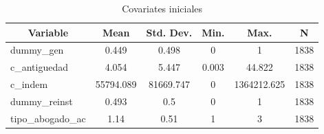 
\begin{table}[htbp]\centering \caption{Covariates iniciales \label{sumstat}}
\begin{tabular}{l c c c c c}\hline\hline
\multicolumn{1}{c}{\textbf{Variable}} & \textbf{Mean}
 & \textbf{Std. Dev.}& \textbf{Min.} &  \textbf{Max.} & \textbf{N}\\ \hline
dummy\_gen & 0.449 & 0.498 & 0 & 1 & 1838\\
c\_antiguedad & 4.054 & 5.447 & 0.003 & 44.822 & 1838\\
c\_indem & 55794.089 & 81669.747 & 0 & 1364212.625 & 1838\\
dummy\_reinst & 0.493 & 0.5 & 0 & 1 & 1838\\
tipo\_abogado\_ac & 1.14 & 0.51 & 1 & 3 & 1838\\
\hline\end{tabular}
\end{table}
